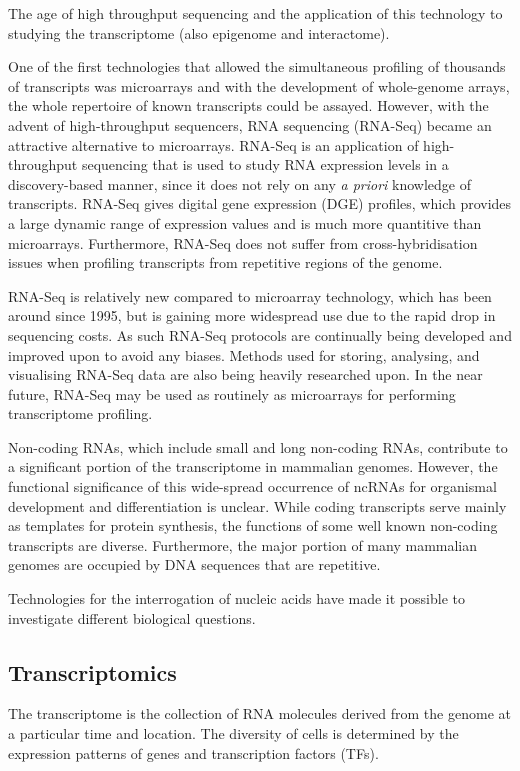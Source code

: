 The age of high throughput sequencing and the application of this technology to studying the transcriptome (also epigenome and interactome).

One of the first technologies that allowed the simultaneous profiling of thousands of transcripts was microarrays and with the development of whole-genome arrays, the whole repertoire of known transcripts could be assayed. However, with the advent of high-throughput sequencers, RNA sequencing (RNA-Seq) became an attractive alternative to microarrays. RNA-Seq is an application of high-throughput sequencing that is used to study RNA expression levels in a discovery-based manner, since it does not rely on any \textit{a priori} knowledge of transcripts. RNA-Seq gives digital gene expression (DGE) profiles, which provides a large dynamic range of expression values and is much more quantitive than microarrays. Furthermore, RNA-Seq does not suffer from cross-hybridisation issues when profiling transcripts from repetitive regions of the genome.

RNA-Seq is relatively new compared to microarray technology, which has been around since 1995, but is gaining more widespread use due to the rapid drop in sequencing costs. As such RNA-Seq protocols are continually being developed and improved upon to avoid any biases. Methods used for storing, analysing, and visualising RNA-Seq data are also being heavily researched upon. In the near future, RNA-Seq may be used as routinely as microarrays for performing transcriptome profiling.

Non-coding RNAs, which include small and long non-coding RNAs, contribute to a significant portion of the transcriptome in mammalian genomes. However, the functional significance of this wide-spread occurrence of ncRNAs for organismal development and differentiation is unclear. While coding transcripts serve mainly as templates for protein synthesis, the functions of some well known non-coding transcripts are diverse. Furthermore, the major portion of many mammalian genomes are occupied by DNA sequences that are repetitive.

Technologies for the interrogation of nucleic acids have made it possible to investigate different biological questions.

\subsection{Transcriptomics}

The transcriptome is the collection of RNA molecules derived from the genome at a particular time and location. The diversity of cells is determined by the expression patterns of genes and transcription factors (TFs).

